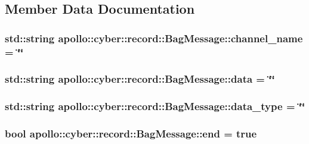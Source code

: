 \subsection{Member Data Documentation}
\hypertarget{structapollo_1_1cyber_1_1record_1_1BagMessage_ac3ab88f059bb07ecd48d9fc3af2f001d}{
\subsubsection[{channel\-\_\-name}]{\setlength{\rightskip}{0pt plus 5cm}std\-::string apollo\-::cyber\-::record\-::\-Bag\-Message\-::channel\-\_\-name = \char`\"{}\char`\"{}}}\label{structapollo_1_1cyber_1_1record_1_1BagMessage_ac3ab88f059bb07ecd48d9fc3af2f001d}
\hypertarget{structapollo_1_1cyber_1_1record_1_1BagMessage_af57cc78e5af39036a2b5374795a31dc0}{
\subsubsection[{data}]{\setlength{\rightskip}{0pt plus 5cm}std\-::string apollo\-::cyber\-::record\-::\-Bag\-Message\-::data = \char`\"{}\char`\"{}}}\label{structapollo_1_1cyber_1_1record_1_1BagMessage_af57cc78e5af39036a2b5374795a31dc0}
\hypertarget{structapollo_1_1cyber_1_1record_1_1BagMessage_a2b36d8c047935f60f4d4fa42fa984c46}{
\subsubsection[{data\-\_\-type}]{\setlength{\rightskip}{0pt plus 5cm}std\-::string apollo\-::cyber\-::record\-::\-Bag\-Message\-::data\-\_\-type = \char`\"{}\char`\"{}}}\label{structapollo_1_1cyber_1_1record_1_1BagMessage_a2b36d8c047935f60f4d4fa42fa984c46}
\hypertarget{structapollo_1_1cyber_1_1record_1_1BagMessage_ab5656e5d9f1be2b9cc239bd09cf469f0}{
\subsubsection[{end}]{\setlength{\rightskip}{0pt plus 5cm}bool apollo\-::cyber\-::record\-::\-Bag\-Message\-::end = true}}\label{structapollo_1_1cyber_1_1record_1_1BagMessage_ab5656e5d9f1be2b9cc239bd09cf469f0}
